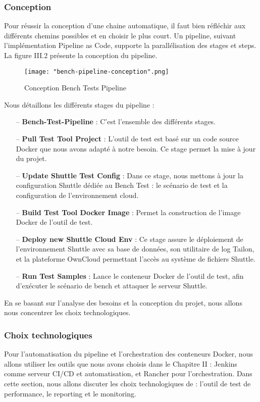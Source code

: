 \begin{spacing}{1.2}
\subsubsection{Conception}
Pour réussir la conception d'une chaine automatique, il faut bien réfléchir aux différents chemins possibles et en choisir le plus court. Un pipeline, suivant l'implémentation Pipeline as Code, supporte la parallélisation des stages et steps. La figure III.2 présente la conception du pipeline.
\begin{figure}[!ht]\centering
\texttt{[image: "bench-pipeline-conception".png]}
\caption{Conception Bench Tests Pipeline}
\label{fig:fig2}
\end{figure}
\FloatBarrier
Nous détaillons les différents stages du pipeline : 
\begin{itemize}
    \setlength\itemsep{0em}
    \item[--] \textbf{Bench-Test-Pipeline} : C'est l'ensemble des différents stages.
    \item[--] \textbf{Pull Test Tool Project} : L'outil de test est basé sur un code source Docker que nous avons adapté à notre besoin. Ce stage permet la mise à jour du projet. 
    \item[--] \textbf{Update Shuttle Test Config} : Dans ce stage, nous mettons à jour la configuration Shuttle dédiée au Bench Test : le scénario de test et la configuration de l'environnement cloud.  
    \item[--] \textbf{Build Test Tool Docker Image} : Permet la construction de l'image Docker de l'outil de test.
    \item[--] \textbf{Deploy new Shuttle Cloud Env} : Ce stage assure le déploiement de l'environnement Shuttle avec sa base de données, son utilitaire de log Tailon, et la plateforme OwnCloud permettant l'accès au système de fichiers Shuttle.
    \item[--] \textbf{Run Test Samples} : Lance le conteneur Docker de l'outil de test, afin d'exécuter le scénario de bench et attaquer le serveur Shuttle.
\end{itemize}
En se basant sur l'analyse des besoins et la conception du projet, nous allons nous concentrer les choix technologiques. 
\subsubsection{Choix technologiques}
Pour l'automatisation du pipeline et l'orchestration des conteneurs Docker, nous allons utiliser les outils que nous avons choisis dans le Chapitre II : Jenkins comme serveur CI/CD et automatisation, et Rancher pour l'orchestration. Dans cette section, nous allons discuter les choix technologiques de : l'outil de test de performance, le reporting et le monitoring. 


\end{spacing}

